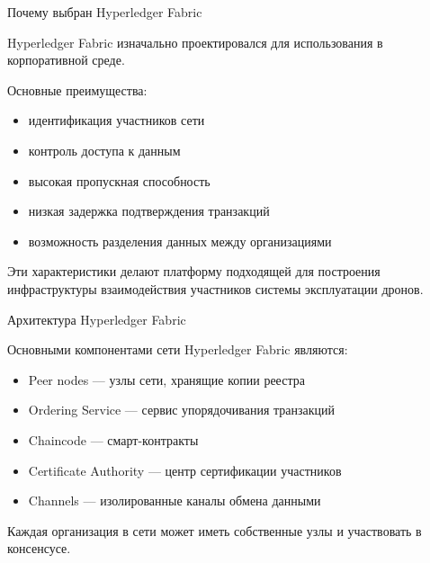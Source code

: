 \documentclass[aspectratio=169]{beamer}
\begin{document}
\begin{frame}{Почему выбран Hyperledger Fabric}

Hyperledger Fabric изначально проектировался для использования в корпоративной среде.

Основные преимущества:

\begin{itemize}
\item идентификация участников сети
\item контроль доступа к данным
\item высокая пропускная способность
\item низкая задержка подтверждения транзакций
\item возможность разделения данных между организациями
\end{itemize}

Эти характеристики делают платформу подходящей для построения инфраструктуры взаимодействия участников системы эксплуатации дронов.

\end{frame}


\begin{frame}{Архитектура Hyperledger Fabric}

Основными компонентами сети Hyperledger Fabric являются:

\begin{itemize}
\item Peer nodes — узлы сети, хранящие копии реестра
\item Ordering Service — сервис упорядочивания транзакций
\item Chaincode — смарт-контракты
\item Certificate Authority — центр сертификации участников
\item Channels — изолированные каналы обмена данными
\end{itemize}

Каждая организация в сети может иметь собственные узлы и участвовать в консенсусе.

\end{frame}

\end{document}

